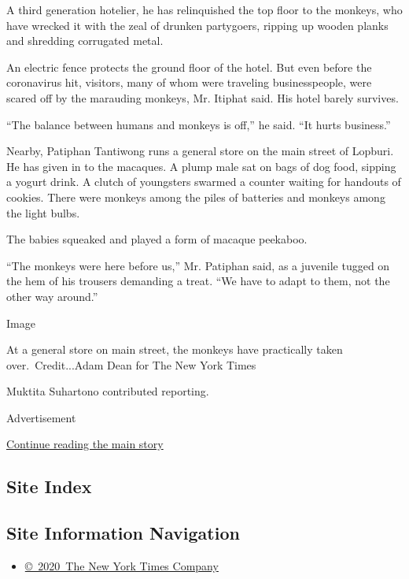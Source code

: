 A third generation hotelier, he has relinquished the top floor to the
monkeys, who have wrecked it with the zeal of drunken partygoers,
ripping up wooden planks and shredding corrugated metal.

An electric fence protects the ground floor of the hotel. But even
before the coronavirus hit, visitors, many of whom were traveling
businesspeople, were scared off by the marauding monkeys, Mr. Itiphat
said. His hotel barely survives.

``The balance between humans and monkeys is off,'' he said. ``It hurts
business.''

Nearby, Patiphan Tantiwong runs a general store on the main street of
Lopburi. He has given in to the macaques. A plump male sat on bags of
dog food, sipping a yogurt drink. A clutch of youngsters swarmed a
counter waiting for handouts of cookies. There were monkeys among the
piles of batteries and monkeys among the light bulbs.

The babies squeaked and played a form of macaque peekaboo.

``The monkeys were here before us,'' Mr. Patiphan said, as a juvenile
tugged on the hem of his trousers demanding a treat. ``We have to adapt
to them, not the other way around.''

Image

At a general store on main street, the monkeys have practically taken
over.~Credit...Adam Dean for The New York Times

Muktita Suhartono contributed reporting.

Advertisement

\protect\hyperlink{after-bottom}{Continue reading the main story}

\hypertarget{site-index}{%
\subsection{Site Index}\label{site-index}}

\hypertarget{site-information-navigation}{%
\subsection{Site Information
Navigation}\label{site-information-navigation}}

\begin{itemize}
\tightlist
\item
  \href{https://help.nytimes.com/hc/en-us/articles/115014792127-Copyright-notice}{©~2020~The
  New York Times Company}
\end{itemize}

